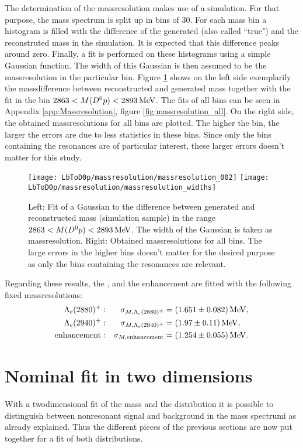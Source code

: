 The determination of the massresolution makes use of a simulation.
For that purpose, the \Dz\proton mass spectrum is split up in bins of 30\mev.
For each mass bin a histogram is filled with the difference of the generated (also called ``true") and the reconstruted mass in the simulation.
It is expected that this difference peaks around zero.
Finally, a fit is performed on these histograms using a simple Gaussian function.
The width of this Gaussian is then assumed to be the massresolution in the particular bin.
Figure \ref{fig:massresolution} shows on the left side exemplarily the massdifference between reconstructed and generated mass together with the fit in the bin $2863 < M({{D}^0}{p}) < 2893 \mathrm{\,Me\kern -0.1em V}$. 
The fits of all bins can be seen in Appendix \ref{app:Massresolution}, figure \ref{fig:massresolution_all}.
On the right side, the obtained massresolutions for all bins are plotted.
The higher the bin, the larger the errors are due to less statistics in these bins.
Since only the bins containing the resonances are of particular interest, these larger errors doesn't matter for this study.
\begin{figure}[hptb]
    \centering
	\texttt{[image: LbToD0p/massresolution/massresolution\_002]}
	\texttt{[image: LbToD0p/massresolution/massresolution\_widths]}
	\caption{Left: Fit of a Gaussian to the difference between generated and reconstructed \Dz\proton mass (simulation sample) in the range $2863 < M({{D}^0}{p}) < 2893 \mathrm{\,Me\kern -0.1em V}$. The width of the Gaussian is taken as massresolution. Right: Obtained massresolutions for all bins. 
             The large errors in the higher bins doesn't matter for the desired purpose as only the bins containing the resonances are relevant.}
    \label{fig:massresolution}
\end{figure}

Regarding these results, the \LcResI, \LcResII and the enhancement are fitted with the following fixed massresolutions:
\begin{align*}
    {\ensuremath{\Lambda}}_{c}(2880)^+:           && \sigma_{M,{\Lambda}_{c}(2880)^+}            &= (1.651 \pm 0.082) \mathrm{\,Me\kern -0.1em V}, \\
    {\Lambda}_{c}(2940)^+:          && \sigma_{M,{\Lambda}_{c}(2940)^+}           &= (1.97 \pm 0.11) \mathrm{\,Me\kern -0.1em V}, \\
    \text{enhancement}:&& \sigma_{M,\text{enhancement}} &= (1.254 \pm 0.055) \mathrm{\,Me\kern -0.1em V}.
\end{align*}

\section{Nominal fit in two dimensions}
\label{sec:Fit_2D}
With a twodimensional fit of the \Dz\proton mass and the \logIP distribution it is possible to distinguish between nonresonant signal and background in the \Dz\proton mass spectrumi as already explained.
Thus the different pieces of the previous sections are now put together for a fit of both distributions.

